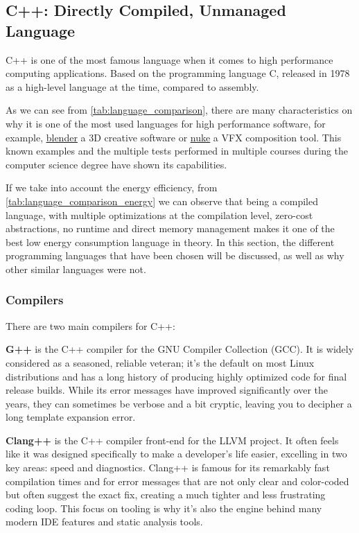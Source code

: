 \subsection{C++: Directly Compiled, Unmanaged Language}
C++ is one of the most famous language when it comes to high performance computing applications. Based on the programming language C, released in 1978 as a high-level language at the time, compared to assembly.


As we can see from \autoref{tab:language_comparison}, there are many characteristics on why it is one of the most used languages for high performance software, for example, \underline{\href{https://blender.org}{blender}} a 3D creative software or \underline{\href{https://www.foundry.com/products/nuke-family}{nuke}} a VFX composition tool. This known examples and the multiple tests performed in multiple courses during the computer science degree have shown its capabilities.

If we take into account the energy efficiency, from \autoref{tab:language_comparison_energy} we can observe that being a compiled language, with multiple optimizations at the compilation level, zero-cost abstractions, no \gls{runtime} and direct memory management makes it one of the best low energy consumption language in theory.
In this section, the different programming languages that have been chosen will be discussed, as well as why other similar languages were not.



\subsubsection{Compilers}

There are two main compilers for C++:

\textbf{G++} is the C++ compiler for the GNU Compiler Collection (GCC). It is widely considered as a seasoned, reliable veteran; it's the default on most Linux distributions and has a long history of producing highly optimized code for final release builds. While its error messages have improved significantly over the years, they can sometimes be verbose and a bit cryptic, leaving you to decipher a long template expansion error.

\textbf{Clang++} is the C++ compiler front-end for the \gls{LLVM} project. It often feels like it was designed specifically to make a developer's life easier, excelling in two key areas: speed and diagnostics. Clang++ is famous for its remarkably fast compilation times and for error messages that are not only clear and color-coded but often suggest the exact fix, creating a much tighter and less frustrating coding loop. This focus on tooling is why it's also the engine behind many modern IDE features and static analysis tools.


